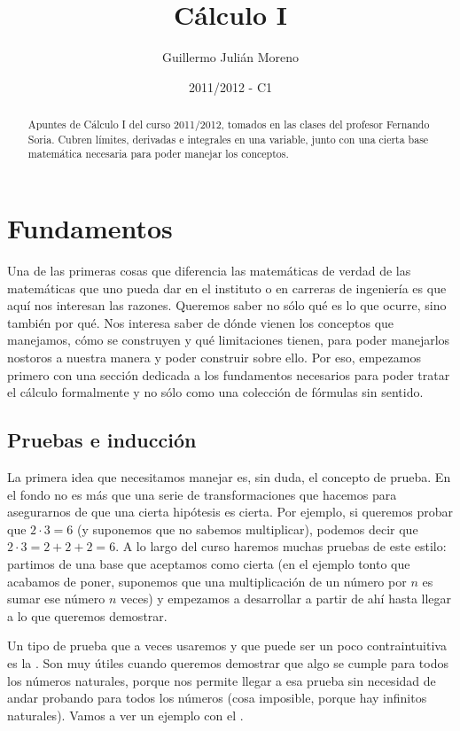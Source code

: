 \documentclass[palatino, nochap]{apuntes}
\author{Guillermo Julián Moreno}
\date{2011/2012 - C1}
\title{Cálculo I}
\begin{document}
\begin{abstract}
Apuntes de Cálculo I del curso 2011/2012, tomados en las clases del profesor Fernando Soria. Cubren límites, derivadas e integrales en una variable, junto con una cierta base matemática necesaria para poder manejar los conceptos.
\end{abstract}

\maketitle

\tableofcontents

\section{Fundamentos}
\label{sec:Fundamentos}

Una de las primeras cosas que diferencia las matemáticas de verdad de las matemáticas que uno pueda dar en el instituto o en carreras de ingeniería es que aquí nos interesan las razones. Queremos saber no sólo qué es lo que ocurre, sino también por qué. Nos interesa saber de dónde vienen los conceptos que manejamos, cómo se construyen y qué limitaciones tienen, para poder manejarlos nostoros a nuestra manera y poder construir sobre ello. Por eso, empezamos primero con una sección dedicada a los fundamentos necesarios para poder tratar el cálculo formalmente y no sólo como una colección de fórmulas sin sentido.

\subsection{Pruebas e inducción}

La primera idea que necesitamos manejar es, sin duda, el concepto de prueba. En el fondo no es más que una serie de transformaciones que hacemos para asegurarnos de que una cierta hipótesis es cierta. Por ejemplo, si queremos probar que $2 · 3 = 6$ (y suponemos que no sabemos multiplicar), podemos decir que $2·3 = 2 + 2 + 2 = 6$. A lo largo del curso haremos muchas pruebas de este estilo: partimos de una base que aceptamos como cierta (en el ejemplo tonto que acabamos de poner, suponemos que una multiplicación de un número por $n$ es sumar ese número $n$ veces) y empezamos a desarrollar a partir de ahí hasta llegar a lo que queremos demostrar.

Un tipo de prueba que a veces usaremos y que puede ser un poco contraintuitiva es la . Son muy útiles cuando queremos demostrar que algo se cumple para todos los números naturales, porque nos permite llegar a esa prueba sin necesidad de andar probando para todos los números (cosa imposible, porque hay infinitos naturales). Vamos a ver un ejemplo con el .
\end{document}
